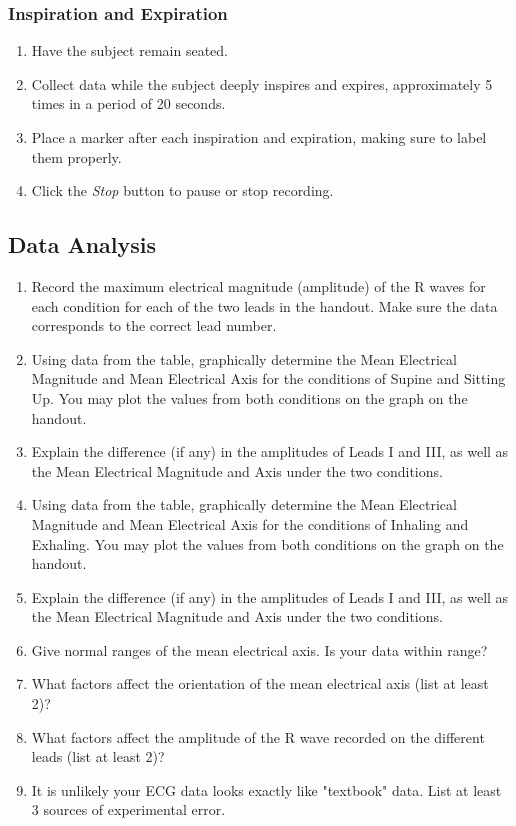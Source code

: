 \documentclass{article}
\begin{document}
\subsubsection*{Inspiration and Expiration}
\begin{enumerate}
	\item Have the subject remain seated.
	\item Collect data while the subject deeply inspires and expires, approximately 5 times in a period of 20 seconds.
	\item Place a marker after each inspiration and expiration, making sure to label them properly.
	\item Click the \textit{Stop} button to pause or stop recording.
\end{enumerate}

\subsection*{Data Analysis}
\begin{enumerate}
	\item Record the maximum electrical magnitude (amplitude) of the R waves for each condition for each of the two leads in the handout. Make sure the data corresponds to the correct lead number.
	\item Using data from the table, graphically determine the Mean Electrical Magnitude and Mean Electrical Axis for the conditions of Supine and Sitting Up. You may plot the values from both conditions on the graph on the handout.
	\item Explain the difference (if any) in the amplitudes of Leads I and III, as well as the Mean Electrical Magnitude and Axis under the two conditions.
	\item Using data from the table, graphically determine the Mean Electrical Magnitude and Mean Electrical Axis for the conditions of Inhaling and Exhaling. You may plot the values from both conditions on the graph on the handout.
	\item Explain the difference (if any) in the amplitudes of Leads I and III, as well as the Mean Electrical Magnitude and Axis under the two conditions.
	\item Give normal ranges of the mean electrical axis. Is your data within range?
	\item What factors affect the orientation of the mean electrical axis (list at least 2)?
	\item What factors affect the amplitude of the R wave recorded on the different leads (list at least 2)?
	\item It is unlikely your ECG data looks exactly like "textbook" data. List at least 3 sources of experimental error.
\end{enumerate}
\end{document}
